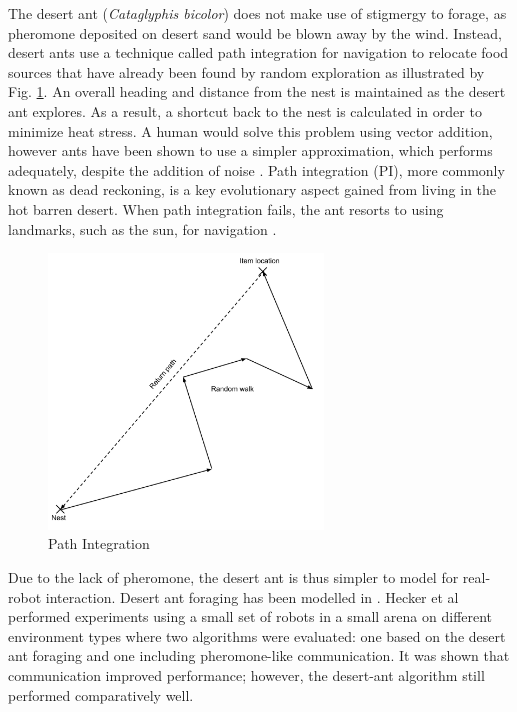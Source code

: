 
The desert ant (\textit{Cataglyphis bicolor}) does not make use of stigmergy to forage, as pheromone deposited on desert sand would be blown away by the wind. Instead, desert ants use a technique called path integration for navigation to relocate food sources that have already been found by random exploration \cite{collett1998local,wehner2003desert} as illustrated by Fig. \ref{pathintegration}. An overall heading and distance from the nest is maintained as the desert ant explores. As a result, a shortcut back to the nest is calculated in order to minimize heat stress. A human would solve this problem using vector addition, however ants have been shown to use a simpler approximation, which performs adequately, despite the addition of noise \cite{muller1988path}. Path integration (PI), more commonly known as dead reckoning, is a key evolutionary aspect gained from living in the hot barren desert. When path integration fails, the ant resorts to using landmarks, such as the sun, for navigation \cite{collett1998local}. 

\begin{figure} [h]
	\centering
	\includegraphics[width=0.65\textwidth]{chapters/chapter2/figures/PathIntegration.pdf}
	\caption{Path Integration }
	\label{pathintegration}
\end{figure}

Due to the lack of pheromone, the desert ant is thus simpler to model for real-robot interaction. Desert ant foraging has been modelled in \cite{moller1998modeling,hecker2012formica,}. Hecker et al \cite{hecker2012formica} performed experiments using a small set of robots in a small arena on different environment types where two algorithms were evaluated: one based on the desert ant foraging and one including pheromone-like communication. It was shown that communication improved performance; however, the desert-ant algorithm still performed comparatively well. 

